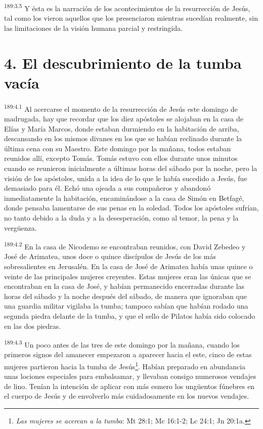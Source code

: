 \par
\textsuperscript{189:3.5} Y ésta es la narración de los acontecimientos de la resurrección de Jesús, tal como los vieron aquellos que los presenciaron mientras sucedían realmente, sin las limitaciones de la visión humana parcial y restringida.

\section*{4. El descubrimiento de la tumba vacía}
\par
\textsuperscript{189:4.1} Al acercarse el momento de la resurrección de Jesús este domingo de madrugada, hay que recordar que los diez apóstoles se alojaban en la casa de Elías y María Marcos, donde estaban durmiendo en la habitación de arriba, descansando en los mismos divanes en los que se habían reclinado durante la última cena con su Maestro. Este domingo por la mañana, todos estaban reunidos allí, excepto Tomás. Tomás estuvo con ellos durante unos minutos cuando se reunieron inicialmente a últimas horas del sábado por la noche, pero la visión de los apóstoles, unida a la idea de lo que le había sucedido a Jesús, fue demasiado para él. Echó una ojeada a sus compañeros y abandonó inmediatamente la habitación, encaminándose a la casa de Simón en Betfagé, donde pensaba lamentarse de sus penas en la soledad. Todos los apóstoles sufrían, no tanto debido a la duda y a la desesperación, como al temor, la pena y la verg\"uenza.

\par
\textsuperscript{189:4.2} En la casa de Nicodemo se encontraban reunidos, con David Zebedeo y José de Arimatea, unos doce o quince discípulos de Jesús de los más sobresalientes en Jerusalén. En la casa de José de Arimatea había unas quince o veinte de las principales mujeres creyentes. Estas mujeres eran las únicas que se encontraban en la casa de José, y habían permanecido encerradas durante las horas del sábado y la noche después del sábado, de manera que ignoraban que una guardia militar vigilaba la tumba; tampoco sabían que habían rodado una segunda piedra delante de la tumba, y que el sello de Pilatos había sido colocado en las dos piedras.

\par
\textsuperscript{189:4.3} Un poco antes de las tres de este domingo por la mañana, cuando los primeros signos del amanecer empezaron a aparecer hacia el este, cinco de estas mujeres partieron hacia la tumba de Jesús\footnote{\textit{Las mujeres se acercan a la tumba}: Mt 28:1; Mc 16:1-2; Lc 24:1; Jn 20:1a.}. Habían preparado en abundancia unas lociones especiales para embalsamar, y llevaban consigo numerosos vendajes de lino. Tenían la intención de aplicar con más esmero los ung\"uentos fúnebres en el cuerpo de Jesús y de envolverlo más cuidadosamente en los nuevos vendajes.

